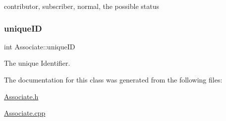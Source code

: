 contributor, subscriber, normal, the possible status 

\mbox{\label{classAssociate_a55a1f311ac7cb8020e9631f283cb74e6}} 
\subsubsection{\texorpdfstring{unique\+ID}{uniqueID}}
{\footnotesize\ttfamily int Associate\+::unique\+ID\hspace{0.3cm}{\ttfamily [private]}}



The unique Identifier. 



The documentation for this class was generated from the following files\+:\begin{DoxyCompactItemize}
\item 
\mbox{\hyperlink{Associate_8h}{Associate.\+h}}\item 
\mbox{\hyperlink{Associate_8cpp}{Associate.\+cpp}}\end{DoxyCompactItemize}

